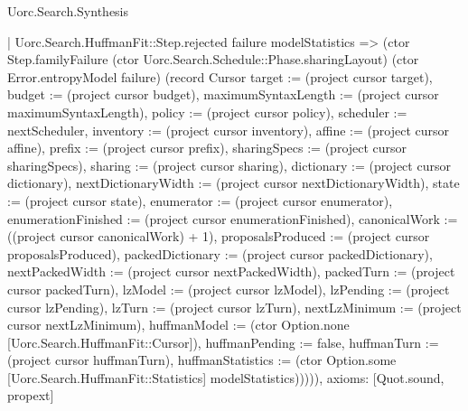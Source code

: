 \begin{lexlean}{Uorc.Search.Synthesis}
\begin{semanticmodule}
{      | Uorc.Search.HuffmanFit::Step.rejected failure modelStatistics => (ctor Step.familyFailure (ctor Uorc.Search.Schedule::Phase.sharingLayout) (ctor Error.entropyModel failure) (record Cursor {target := (project cursor target), budget := (project cursor budget), maximumSyntaxLength := (project cursor maximumSyntaxLength), policy := (project cursor policy), scheduler := nextScheduler, inventory := (project cursor inventory), affine := (project cursor affine), prefix := (project cursor prefix), sharingSpecs := (project cursor sharingSpecs), sharing := (project cursor sharing), dictionary := (project cursor dictionary), nextDictionaryWidth := (project cursor nextDictionaryWidth), state := (project cursor state), enumerator := (project cursor enumerator), enumerationFinished := (project cursor enumerationFinished), canonicalWork := ((project cursor canonicalWork) + 1), proposalsProduced := (project cursor proposalsProduced), packedDictionary := (project cursor packedDictionary), nextPackedWidth := (project cursor nextPackedWidth), packedTurn := (project cursor packedTurn), lzModel := (project cursor lzModel), lzPending := (project cursor lzPending), lzTurn := (project cursor lzTurn), nextLzMinimum := (project cursor nextLzMinimum), huffmanModel := (ctor Option.none [Uorc.Search.HuffmanFit::Cursor]), huffmanPending := false, huffmanTurn := (project cursor huffmanTurn), huffmanStatistics := (ctor Option.some [Uorc.Search.HuffmanFit::Statistics] modelStatistics)})))),
  axioms: [Quot.sound, propext]
}


\end{semanticmodule}
\end{lexlean}
